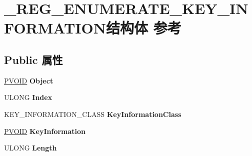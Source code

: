 \hypertarget{struct___r_e_g___e_n_u_m_e_r_a_t_e___k_e_y___i_n_f_o_r_m_a_t_i_o_n}{}\section{\+\_\+\+R\+E\+G\+\_\+\+E\+N\+U\+M\+E\+R\+A\+T\+E\+\_\+\+K\+E\+Y\+\_\+\+I\+N\+F\+O\+R\+M\+A\+T\+I\+O\+N结构体 参考}
\label{struct___r_e_g___e_n_u_m_e_r_a_t_e___k_e_y___i_n_f_o_r_m_a_t_i_o_n}
\subsection*{Public 属性}
\begin{DoxyCompactItemize}
\item 
\mbox{\label{struct___r_e_g___e_n_u_m_e_r_a_t_e___k_e_y___i_n_f_o_r_m_a_t_i_o_n_a74967c15bae19ec89c2389b2caf7ae3c}} 
\hyperlink{interfacevoid}{P\+V\+O\+ID} {\bfseries Object}
\item 
\mbox{\label{struct___r_e_g___e_n_u_m_e_r_a_t_e___k_e_y___i_n_f_o_r_m_a_t_i_o_n_a59e985d44fa276b16e1f86d100931c7a}} 
U\+L\+O\+NG {\bfseries Index}
\item 
\mbox{\label{struct___r_e_g___e_n_u_m_e_r_a_t_e___k_e_y___i_n_f_o_r_m_a_t_i_o_n_a2048b4a0cae8c44acad5e26466401b8a}} 
K\+E\+Y\+\_\+\+I\+N\+F\+O\+R\+M\+A\+T\+I\+O\+N\+\_\+\+C\+L\+A\+SS {\bfseries Key\+Information\+Class}
\item 
\mbox{\label{struct___r_e_g___e_n_u_m_e_r_a_t_e___k_e_y___i_n_f_o_r_m_a_t_i_o_n_a82060ec6475da2c3a9174e656dc53de8}} 
\hyperlink{interfacevoid}{P\+V\+O\+ID} {\bfseries Key\+Information}
\item 
\mbox{\label{struct___r_e_g___e_n_u_m_e_r_a_t_e___k_e_y___i_n_f_o_r_m_a_t_i_o_n_a0153d7f0e3d23f3e4ab51918a34195d0}} 
U\+L\+O\+NG {\bfseries Length}
\item 

\end{DoxyCompactItemize}
